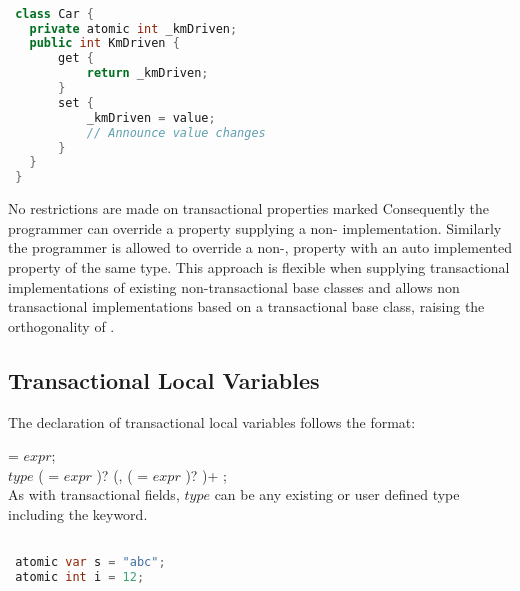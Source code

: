 \begin{lstlisting}[label=lst:atomic_property,
 caption={Manual Transactional Property},
 language=Java, 
 showspaces=false,
 showtabs=false,
 breaklines=true,
 showstringspaces=false,
 breakatwhitespace=true,
 commentstyle=\color{greencomments},
 keywordstyle=\color{bluekeywords},
 stringstyle=\color{redstrings},
 morekeywords={atomic, retry, orElse, var, get, set}]  % Start your code-block

 class Car {
   private atomic int _kmDriven;
   public int KmDriven {
       get {
           return _kmDriven;
       }
       set {
           _kmDriven = value;
           // Announce value changes
       }
   }
 }
\end{lstlisting}

No restrictions are made on transactional properties marked  Consequently the programmer can override a  property supplying a non- implementation. Similarly the programmer is allowed to override a non-,  property with an  auto implemented property of the same type. This approach is flexible when supplying transactional implementations of existing non-transactional base classes and allows non transactional implementations based on a transactional base class, raising the orthogonality of \stmname.

\subsection{Transactional Local Variables}\label{subsec:local_variables}
The declaration of transactional local variables follows the format:

   = $expr$;\\
 $type$  ( = $expr$ )? (,  ( = $expr$ )? )+ ;\\

As with transactional fields, $type$ can be any existing or user defined type including the  keyword.
\begin{lstlisting}[label=lst:local_variable,
 caption={Local Transactional Variable},
 language=Java, 
 showspaces=false,
 showtabs=false,
 breaklines=true,
 showstringspaces=false,
 breakatwhitespace=true,
 commentstyle=\color{greencomments},
 keywordstyle=\color{bluekeywords},
 stringstyle=\color{redstrings},
 morekeywords={atomic, retry, orElse, var, get, set}]  % Start your code-block

 atomic var s = "abc";
 atomic int i = 12; 
\end{lstlisting}

